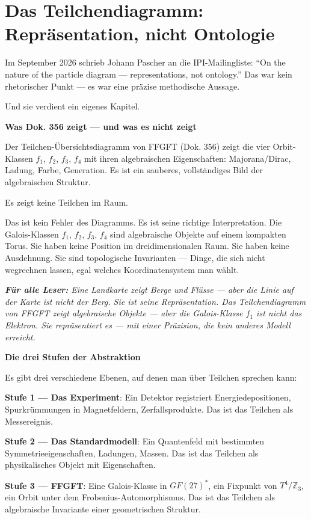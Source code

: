 \documentclass[11pt,oneside]{book}
\newenvironment{laierspur}{%
  \par\vspace{4pt}%
  \noindent\small\itshape\color{blue!60!black}%
  \textbf{Für alle Leser:}\enspace\ignorespaces}{%
  \par\vspace{4pt}\normalsize\normalfont\normalcolor}
\begin{document}
\chapter{Das Teilchendiagramm: Repräsentation, nicht Ontologie}

Im September 2026 schrieb Johann Pascher an die IPI-Mailingliste:
\enquote{On the nature of the particle diagram — representations, not ontology.}
Das war kein rhetorischer Punkt — es war eine präzise methodische Aussage.


Und sie verdient ein eigenes Kapitel.


\textbf{Was Dok. 356 zeigt — und was es nicht zeigt}


Der Teilchen-Übersichtsdiagramm von FFGFT (Dok. 356) zeigt die vier
Orbit-Klassen {$f_1$, $f_2$, $f_3$, $f_4$} mit ihren algebraischen Eigenschaften:
Majorana/Dirac, Ladung, Farbe, Generation. Es ist ein sauberes,
vollständiges Bild der algebraischen Struktur.


Es zeigt keine Teilchen im Raum.


Das ist kein Fehler des Diagramms. Es ist seine richtige Interpretation.
Die Galois-Klassen {$f_1$, $f_2$, $f_3$, $f_4$} sind algebraische Objekte auf einem
kompakten Torus. Sie haben keine Position im dreidimensionalen Raum.
Sie haben keine Ausdehnung. Sie sind topologische Invarianten — Dinge,
die sich nicht wegrechnen lassen, egal welches Koordinatensystem man wählt.


\begin{laierspur}
Eine Landkarte zeigt Berge und Flüsse — aber die Linie
auf der Karte ist nicht der Berg. Sie ist seine Repräsentation. Das
Teilchendiagramm von FFGFT zeigt algebraische Objekte — aber die
Galois-Klasse $f_1$ ist nicht das Elektron. Sie repräsentiert es —
mit einer Präzision, die kein anderes Modell erreicht.
\end{laierspur}

\textbf{Die drei Stufen der Abstraktion}


Es gibt drei verschiedene Ebenen, auf denen man über Teilchen sprechen kann:


\textbf{Stufe 1 — Das Experiment}: Ein Detektor registriert Energiedepositionen,
Spurkrümmungen in Magnetfeldern, Zerfallsprodukte. Das ist das Teilchen
als Messereignis.


\textbf{Stufe 2 — Das Standardmodell}: Ein Quantenfeld mit bestimmten
Symmetrieeigenschaften, Ladungen, Massen. Das ist das Teilchen als
physikalisches Objekt mit Eigenschaften.


\textbf{Stufe 3 — FFGFT}: Eine Galois-Klasse in $GF(27)^*$, ein Fixpunkt von
$T^4/\mathbb{Z}_3$, ein Orbit unter dem Frobenius-Automorphismus. Das ist das Teilchen
als algebraische Invariante einer geometrischen Struktur.
\end{document}

